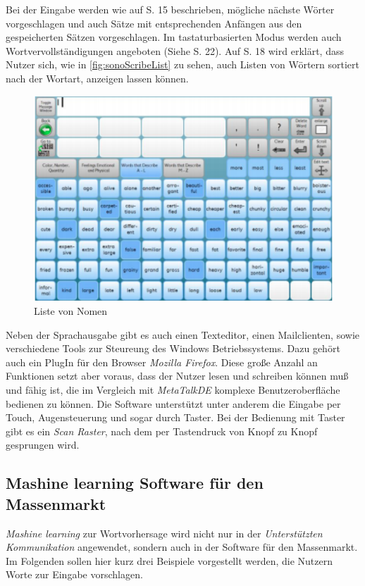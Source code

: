             Bei der Eingabe werden wie auf S. 15 beschrieben, mögliche nächste Wörter vorgeschlagen und auch Sätze mit entsprechenden Anfängen aus den gespeicherten Sätzen vorgeschlagen. Im tastaturbasierten Modus werden auch Wortvervollständigungen angeboten (Siehe S. 22). Auf S. 18 wird erklärt, dass Nutzer sich, wie in \autoref{fig:sonoScribeList} zu sehen, auch Listen von Wörtern sortiert nach der Wortart, anzeigen lassen können.
            
            \begin{figure}[H]
  				\centering
  				\includegraphics[width=.6\linewidth]{images/SonoScribeList.png}
  				\caption{Liste von Nomen \parencite[S. 18]{tobii:sonoScribeManual}}
                \label{fig:sonoScribeList}
			\end{figure}
            
			Neben der Sprachausgabe gibt es auch einen Texteditor, einen Mailclienten, sowie verschiedene Tools zur Steureung des Windows Betriebssystems. Dazu gehört auch ein PlugIn für den Browser \emph{Mozilla Firefox}. Diese große Anzahl an Funktionen setzt aber voraus, dass der Nutzer lesen und schreiben können muß und fähig ist, die im Vergleich mit \emph{MetaTalkDE} komplexe Benutzeroberfläche bedienen zu können. Die Software unterstützt unter anderem die Eingabe per Touch, Augensteuerung und sogar durch Taster. Bei der Bedienung mit Taster gibt es ein \emph{Scan Raster}, nach dem per Tastendruck von Knopf zu Knopf gesprungen wird.
    
	\subsection{Mashine learning Software für den Massenmarkt}
    \emph{Mashine learning} zur Wortvorhersage wird nicht nur in der \emph{Unterstützten Kommunikation} angewendet, sondern auch in der Software für den Massenmarkt. Im Folgenden sollen hier kurz drei Beispiele vorgestellt werden, die Nutzern Worte zur Eingabe vorschlagen.
        
